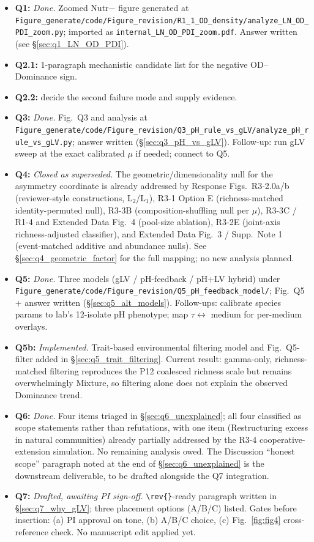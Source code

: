 \documentclass[11pt]{article}
\providecommand{\figref}[1]{Fig.~\ref{#1}}
\begin{document}
\begin{itemize}[itemsep=0pt]
    \item \textbf{Q1:} \emph{Done.} Zoomed Nutr$-$ figure generated at \texttt{Figure\_generate/code/Figure\_revision/R1\_1\_OD\_density/analyze\_LN\_OD\_PDI\_zoom.py}; imported as \texttt{internal\_LN\_OD\_PDI\_zoom.pdf}. Answer written (see \S\ref{sec:q1_LN_OD_PDI}).
    \item \textbf{Q2.1:} 1-paragraph mechanistic candidate list for the negative OD--Dominance sign.
    \item \textbf{Q2.2:} decide the second failure mode and supply evidence.
    \item \textbf{Q3:} \emph{Done.} Fig.~Q3 and analysis at \texttt{Figure\_generate/code/Figure\_revision/Q3\_pH\_rule\_vs\_gLV/analyze\_pH\_rule\_vs\_gLV.py}; answer written (\S\ref{sec:q3_pH_vs_gLV}). Follow-up: run gLV sweep at the exact calibrated $\mu$ if needed; connect to Q5.
    \item \textbf{Q4:} \emph{Closed as superseded.} The geometric/dimensionality null for the asymmetry coordinate is already addressed by Response Figs.~R3-2.0a/b (reviewer-style constructions, L$_2$/L$_1$), R3-1 Option E (richness-matched identity-permuted null), R3-3B (composition-shuffling null per $\mu$), R3-3C / R1-4 and Extended Data Fig.~4 (pool-size ablation), R3-2E (joint-axis richness-adjusted classifier), and Extended Data Fig.~3 / Supp.~Note 1 (event-matched additive and abundance nulls). See \S\ref{sec:q4_geometric_factor} for the full mapping; no new analysis planned.
    \item \textbf{Q5:} \emph{Done.} Three models (gLV / pH-feedback / pH+LV hybrid) under \texttt{Figure\_generate/code/Figure\_revision/Q5\_pH\_feedback\_model/}; Fig.~Q5 + answer written (\S\ref{sec:q5_alt_models}). Follow-ups: calibrate species params to lab's 12-isolate pH phenotype; map $\tau \leftrightarrow$ medium for per-medium overlays.
    \item \textbf{Q5b:} \emph{Implemented.} Trait-based environmental filtering model and Fig.~Q5-filter added in \S\ref{sec:q5_trait_filtering}. Current result: gamma-only, richness-matched filtering reproduces the P12 coalesced richness scale but remains overwhelmingly Mixture, so filtering alone does not explain the observed Dominance trend.
    \item \textbf{Q6:} \emph{Done.} Four items triaged in \S\ref{sec:q6_unexplained}; all four classified as scope statements rather than refutations, with one item (Restructuring excess in natural communities) already partially addressed by the R3-4 cooperative-extension simulation. No remaining analysis owed. The Discussion ``honest scope'' paragraph noted at the end of \S\ref{sec:q6_unexplained} is the downstream deliverable, to be drafted alongside the Q7 integration.
    \item \textbf{Q7:} \emph{Drafted, awaiting PI sign-off.} \texttt{\textbackslash rev\{\}}-ready paragraph written in \S\ref{sec:q7_why_gLV}; three placement options (A/B/C) listed. Gates before insertion: (a) PI approval on tone, (b) A/B/C choice, (c) \figref{fig:fig4} cross-reference check. No manuscript edit applied yet.
\end{itemize}
\end{document}

